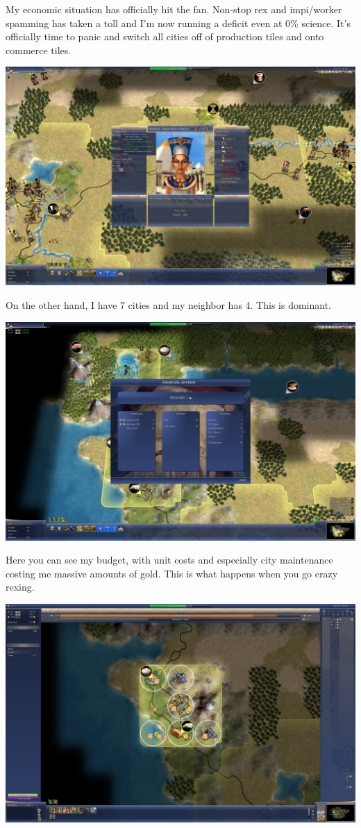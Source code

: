 \documentclass[10pt]{article}
\begin{document}
My economic situation has officially hit the fan. Non-stop rex and impi/worker spamming has taken a toll
and I'm now running a deficit even at 0\% science. It's officially time to panic and switch all cities off
of production tiles and onto commerce tiles.

\includegraphics[width=1.0\textwidth]{63}

On the other hand, I have 7 cities and my neighbor has 4. This is dominant.

\includegraphics[width=1.0\textwidth]{64}

Here you can see my budget, with unit costs and especially city maintenance costing me massive
amounts of gold. This is what happens when you go crazy rexing.

\includegraphics[width=1.0\textwidth]{66}
\end{document}
